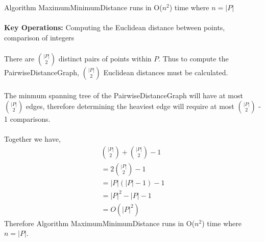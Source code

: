 \documentclass[12pt]{article}
\newenvironment{lemma}[2][Lemma]{\begin{trivlist}
\item[\hskip \labelsep {\bfseries #1}\hskip \labelsep {\bfseries #2.}]}{\end{trivlist}}
\newenvironment{question}[2][Question]{\begin{trivlist}
\item[\hskip \labelsep {\bfseries #1}\hskip \labelsep {\bfseries #2.}]}{\end{trivlist}}
\begin{document}
\begin{question}{3}
  \begin{lemma}{3.2} Algorithm MaximumMinimumDistance runs in O($n^{2}$) time where $n = |P|$ \\ \\
    \textbf{Key Operations:} Computing the Euclidean distance between points, comparison of integers \\ \\
    There are $|P| \choose 2$ distinct pairs of points within $P$.  Thus to
    compute the PairwiseDistanceGraph, $|P| \choose 2$ Euclidean distances must be calculated. \\ \\
    The minmum spanning tree of the PairwiseDistanceGraph will have at most $|P| \choose 2$ edges,
    therefore determining the heaviest edge will require at most $|P| \choose 2$ - 1 comparisons.\\ \\
    Together we have,
    \begin{align*}
      & {|P| \choose 2} + {|P| \choose 2} - 1 & \\
      & = 2{|P| \choose 2} - 1 & \\
      & = |P|(|P| - 1) - 1 & \\
      & = |P|^{2} - |P| - 1 & \\
      & = O(|P|^{2}) &
    \end{align*}
    Therefore Algorithm MaximumMinimumDistance runs in O($n^{2}$) time where $n = |P|$.
  \end{lemma}

\end{question}
\end{document}
